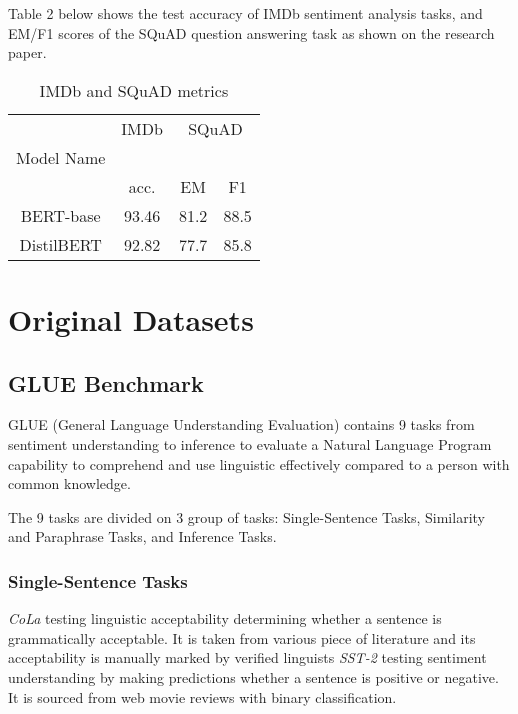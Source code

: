 \documentclass[
  11pt,
]{article}
\begin{document}
Table 2 below shows the test accuracy of IMDb sentiment analysis tasks,
and EM/F1 scores of the SQuAD question answering task as shown on the
research paper.

\begin{longtable}[t]{cccc}
\caption{\label{tab:table2}IMDb and SQuAD metrics}\\
\toprule
\multicolumn{1}{c}{ } & \multicolumn{1}{c}{IMDb} & \multicolumn{2}{c}{SQuAD} \\
\cmidrule(l{3pt}r{3pt}){2-2} \cmidrule(l{3pt}r{3pt}){3-4}
Model Name &  &  & \\
\midrule
 & acc. & EM & F1\\
BERT-base & 93.46 & 81.2 & 88.5\\
DistilBERT & 92.82 & 77.7 & 85.8\\
\bottomrule
\end{longtable}

\hypertarget{original-datasets}{%
\section{Original Datasets}\label{original-datasets}}

\hypertarget{glue-benchmark}{%
\subsection{GLUE Benchmark}\label{glue-benchmark}}

GLUE (General Language Understanding Evaluation) contains 9 tasks from
sentiment understanding to inference to evaluate a Natural Language
Program capability to comprehend and use linguistic effectively compared
to a person with common knowledge.

The 9 tasks are divided on 3 group of tasks: Single-Sentence Tasks,
Similarity and Paraphrase Tasks, and Inference Tasks.

\hypertarget{single-sentence-tasks}{%
\subsubsection{Single-Sentence Tasks}\label{single-sentence-tasks}}

\emph{CoLa} testing linguistic acceptability determining whether a
sentence is grammatically acceptable. It is taken from various piece of
literature and its acceptability is manually marked by verified
linguists \emph{SST-2} testing sentiment understanding by making
predictions whether a sentence is positive or negative. It is sourced
from web movie reviews with binary classification.
\end{document}
